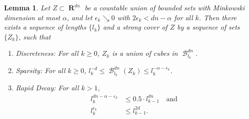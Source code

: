 \documentclass[dvipsnames,letterpaper,12pt]{article}
\numberwithin{equation}{section}
\theoremstyle{plain}
\newtheorem{lemma}{Lemma}
\theoremstyle{remark}
\DeclareMathOperator{\RR}{\mathbf{R}}
\DeclareMathOperator{\B}{\mathcal{B}}
\begin{document}
\begin{lemma}\label{coveringLemma}
	Let $Z \subset \RR^{dn}$ be a countable union of bounded sets with Minkowski dimension at most $\alpha$, and let $\epsilon_k \searrow 0$ with $2\epsilon_k < dn - \alpha$ for all $k$. Then there exists a sequence of lengths $\{ l_k \}$ and a strong cover of $Z$ by a sequence of sets $\{ Z_k \}$, such that
	\begin{enumerate}
		\item\label{DiscretenessProperty} \emph{Discreteness}: For all $k \geq 0$, $Z_k$ is a union of cubes in $\B^{dn}_{l_k}$.

		\item\label{SparsityProperty} \emph{Sparsity}: For all $k \geq 0$, $l_k^{-d} \leq \B^{dn}_{l_k}(Z_k) \leq l_k^{-\alpha-\epsilon_k}$.

		\item\label{RapidDecayProperty} \emph{Rapid Decay}: For all $k > 1$,
			\begin{align}
				l_k^{dn-\alpha-\varepsilon_k} & \leq 0.5 \cdot l_{k-1}^{dn} \label{coverBoundRequirement} \quad \text{and}\ \\
				l_k^{\epsilon_k} & \leq l_{k-1}^{2d}\label{quadDecayRequirement}.
			\end{align}
	\end{enumerate}
\end{lemma}
\end{document}

